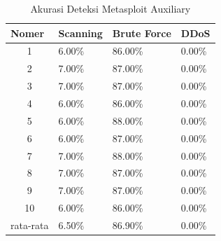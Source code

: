 \begin{table}[H]
	\centering
	\caption{Akurasi Deteksi Metasploit Auxiliary}
	\label{Akurasi Deteksi Metasploit Auxiliary}
	\begin{tabular}{|c|l|l|l|}
		\hline
		\multicolumn{1}{|l|}{Nomer}     & Scanning & Brute Force & DDoS   \\ \hline
		1                               & 6.00\%   & 86.00\%     & 0.00\% \\ \hline
		2                               & 7.00\%   & 87.00\%     & 0.00\% \\ \hline
		3                               & 7.00\%   & 87.00\%     & 0.00\% \\ \hline
		4                               & 6.00\%   & 86.00\%     & 0.00\% \\ \hline
		5                               & 6.00\%   & 88.00\%     & 0.00\% \\ \hline
		6                               & 6.00\%   & 87.00\%     & 0.00\% \\ \hline
		7                               & 7.00\%   & 88.00\%     & 0.00\% \\ \hline
		8                               & 7.00\%   & 87.00\%     & 0.00\% \\ \hline
		9                               & 7.00\%   & 87.00\%     & 0.00\% \\ \hline
		10                              & 6.00\%   & 86.00\%     & 0.00\% \\ \hline
		\multicolumn{1}{|l|}{rata-rata} & 6.50\%   & 86.90\%     & 0.00\% \\ \hline
	\end{tabular}
\end{table}

